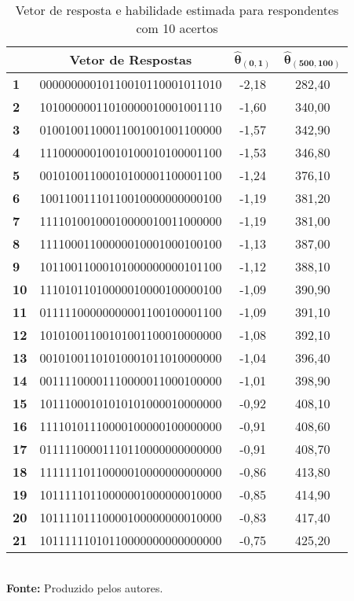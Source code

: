 \begin{table}[!hbt]
	\centering
		\caption{Vetor de resposta e habilidade estimada para respondentes com 10 acertos}
		\label{exemplo-10acertos}
		\begin{tabular*}{0.7\textwidth}{@{\extracolsep{\fill}}lccc@{}}
			\hline
			 & \textbf{Vetor de Respostas} & $\boldsymbol{\hat{\theta}_{(0,1)}}$  & $\boldsymbol{\hat{\theta}_{(500,100)}}$ \\ 
\hline \textbf{1 }& 00000000010110010110001011010 & -2,18 & 282,40 \\ 
\hline \textbf{2 }& 10100000011010000010001001110 & -1,60 & 340,00 \\ 
\hline \textbf{3 }& 01001001100011001001001100000 & -1,57 & 342,90 \\ 
\hline \textbf{4 }& 11100000010010100010100001100 & -1,53 & 346,80 \\ 
\hline \textbf{5 }& 00101001100010100001100001100 & -1,24 & 376,10 \\ 
\hline \textbf{6 }& 10011001110110010000000000100 & -1,19 & 381,20 \\ 
\hline \textbf{7 }& 11110100100010000010011000000 & -1,19 & 381,00 \\ 
\hline \textbf{8 }& 11110001100000010001000100100 & -1,13 & 387,00 \\ 
\hline \textbf{9 }& 10110011000101000000000101100 & -1,12 & 388,10 \\ 
\hline \textbf{10} & 11101011010000010000100000100 & -1,09 & 390,90 \\ 
\hline \textbf{11} & 01111100000000001100100001100 & -1,09 & 391,10 \\ 
\hline \textbf{12} & 10101001100101001100010000000 & -1,08 & 392,10 \\ 
\hline \textbf{13} & 00101001101010001011010000000 & -1,04 & 396,40 \\ 
\hline \textbf{14} & 00111100001110000011000100000 & -1,01 & 398,90 \\ 
\hline \textbf{15} & 10111000101010101000010000000 & -0,92 & 408,10 \\ 
\hline \textbf{16} & 11110101110000100000100000000 & -0,91 & 408,60 \\ 
\hline \textbf{17} & 01111100001110110000000000000 & -0,91 & 408,70 \\ 
\hline \textbf{18} & 11111110110000010000000000000 & -0,86 & 413,80 \\ 
\hline \textbf{19} & 10111110110000001000000010000 & -0,85 & 414,90 \\ 
\hline \textbf{20} & 10111101110000100000000010000 & -0,83 & 417,40 \\ 
\hline \textbf{21} & 10111111010110000000000000000 & -0,75 & 425,20 \\ 
\hline
		\end{tabular*}\\
		\vspace*{0.5cm}
		\small{\textbf{Fonte:} Produzido pelos autores.}
\end{table}


